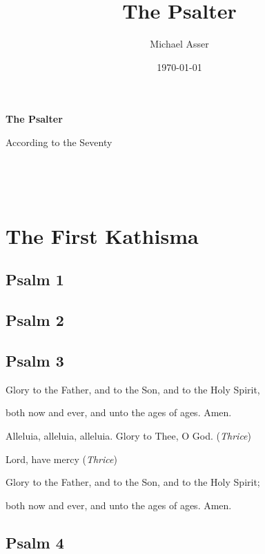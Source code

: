 \documentclass[12pt,openany]{book}
\title{The Psalter}
\author{Michael Asser}
\date{\today}
\newcommand{\kathismabreak}{
  \medskip
  \begin{center}
  \begin{footnotesize}
  Glory to the Father, and to the Son, and to the Holy Spirit,
  
  both now and ever, and unto the ages of ages. Amen.

  Alleluia, alleluia, alleluia. Glory to Thee, O God. (\textit{Thrice})

  Lord, have mercy (\textit{Thrice})

  Glory to the Father, and to the Son, and to the Holy Spirit;
  
  both now and ever, and unto the ages of ages. Amen.
  \end{footnotesize}
  \end{center}
  \smallbreak
}
\begin{document}
\begin{titlepage}
  \begin{center}
  \vspace*{2in}

  \begin{Huge}
  \textbf{The Psalter}
  \end{Huge}

  \vspace{0.25in}
  \begin{small}
  According to the Seventy
  \end{small}

  \vfill

  \end{center}
\end{titlepage}

\newpage

\thispagestyle{empty}
\ %

\newpage

\thispagestyle{empty}
\ %

\newpage


\chapter*{The First Kathisma}
\smallskip

\section{Psalm 1}

\smallskip
\section{Psalm 2}

\smallskip
\section{Psalm 3}


\kathismabreak
\smallskip

\pagebreak %
\section{Psalm 4}

\smallskip
\end{document}
